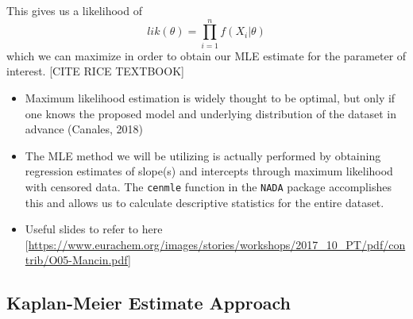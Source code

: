 \documentclass[12pt, twoside]{amherstthesis}
\begin{document}
This gives us a likelihood of \[lik(\theta) = \prod_{i=1}^n f(X_i|\theta)\] which we can maximize in order to obtain our MLE estimate for the parameter of interest. {[}CITE RICE TEXTBOOK{]}
\begin{itemize}
\item
  Maximum likelihood estimation is widely thought to be optimal, but only if one knows the proposed model and underlying distribution of the dataset in advance (Canales, 2018)
\item
  The MLE method we will be utilizing is actually performed by obtaining regression estimates of slope(s) and intercepts through maximum likelihood with censored data. The \texttt{cenmle} function in the \texttt{NADA} package accomplishes this and allows us to calculate descriptive statistics for the entire dataset.
\item
  Useful slides to refer to here {[}\url{https://www.eurachem.org/images/stories/workshops/2017_10_PT/pdf/contrib/O05-Mancin.pdf}{]}
\end{itemize}
\hypertarget{Kaplan-Meier}{%
\subsection{Kaplan-Meier Estimate Approach}\label{Kaplan-Meier}}
\end{document}
